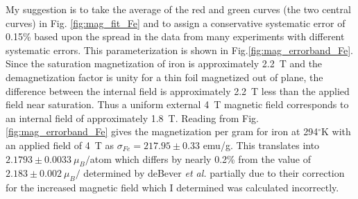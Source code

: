 \documentclass[12pt]{article}
\begin{document}
My suggestion is to take the average of the red and green curves (the two central curves) in Fig. \ref{fig:mag_fit_Fe} and to assign a conservative systematic error of 0.15\% based upon the spread in the data from many experiments with different systematic errors. This parameterization is shown in Fig.\ref{fig:mag_errorband_Fe}. Since the saturation magnetization of iron is approximately 2.2~T and the demagnetization factor is unity for a thin foil magnetized out of plane, the difference between the internal field is approximately 2.2~T less than the applied field near saturation. Thus a uniform external 4~T magnetic field corresponds to an internal field of approximately 1.8~T. Reading from Fig. \ref{fig:mag_errorband_Fe} gives the magnetization per gram for iron at 294$^{\circ}$K with an applied field of 4~T as $\sigma_{Fe}=217.95\pm0.33$ emu/g. This translates into $2.1793\pm0.0033~\mu_B/$atom which differs by nearly 0.2\% from the value of $2.183\pm0.002~\mu_B/$ determined by deBever {\it et al.}\cite{deBever1997} partially due to their correction for the increased magnetic field which I determined was calculated incorrectly. 
\end{document}
